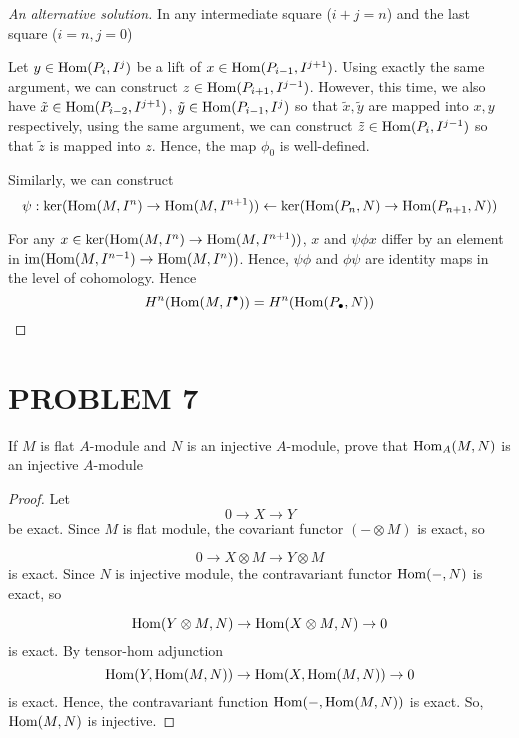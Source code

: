 \begin{proof}[An alternative solution]
	In any intermediate square ($i + j = n$) and the last square ($i=n, j = 0$)
	\begin{center}
	\end{center}
	Let $y \in \operatorname{Hom}(P_i, I^j)$ be a lift of $x \in \operatorname{Hom}(P_{i-1}, I^{j+1})$. Using exactly the same argument, we can construct $z \in \operatorname{Hom}(P_{i+1}, I^{j-1})$. However, this time, we also have $\tilde{x} \in \operatorname{Hom}(P_{i-2}, I^{j+1})$, $\tilde{y} \in \operatorname{Hom}(P_{i-1}, I^j)$ so that $\tilde{x}, \tilde{y}$ are mapped into $x, y$ respectively, using the same argument, we can construct $\tilde{z} \in \operatorname{Hom}(P_i, I^{j-1})$ so that $\tilde{z}$ is mapped into $z$.
	Hence, the map $\phi_0$ is well-defined.
	
	Similarly, we can construct
	$$
		\psi: \ker (\operatorname{Hom}(M, I^n) \to \operatorname{Hom}(M, I^{n+1})) \leftarrow \ker (\operatorname{Hom}(P_n, N) \to \operatorname{Hom}(P_{n+1}, N))
	$$
	
	For any $x \in \ker (\operatorname{Hom}(M, I^n) \to \operatorname{Hom}(M, I^{n+1}))$, $x$ and $\psi \phi x$ differ by an element in $\operatorname{im} (\operatorname{Hom}(M, I^{n-1}) \to \operatorname{Hom}(M, I^n))$. Hence, $\psi \phi$ and $\phi \psi$ are identity maps in the level of cohomology. Hence
	$$
		H^n(\operatorname{Hom}(M, I^\bullet)) = H^n(\operatorname{Hom}(P_\bullet, N))
	$$
\end{proof}

\section{PROBLEM 7}

\begin{problem}[problem 7]
	If $M$ is flat $A$-module and $N$ is an injective $A$-module, prove that $\operatorname{Hom}_A(M, N)$ is an injective $A$-module
\end{problem}

\begin{proof}
	Let 
	$$
		0 \to X \to Y
	$$
	be exact. Since $M$ is flat module, the covariant functor $(- \otimes M)$ is exact, so 
	
	$$
		0 \to X \otimes M \to Y \otimes M
	$$
	is exact. Since $N$ is injective module, the contravariant functor $\operatorname{Hom}(-, N)$ is exact, so
	
	$$
		\operatorname{Hom}(Y \otimes M, N) \to \operatorname{Hom}(X \otimes M, N) \to 0
	$$
	is exact. By tensor-hom adjunction
	$$
		\operatorname{Hom}(Y, \operatorname{Hom}(M, N)) \to \operatorname{Hom}(X, \operatorname{Hom}(M, N)) \to 0
	$$
	is exact. Hence, the contravariant function $\operatorname{Hom}(-, \operatorname{Hom}(M, N))$ is exact. So, $\operatorname{Hom}(M, N)$ is injective.
\end{proof}

